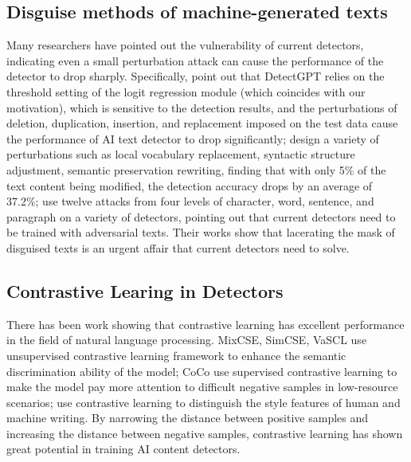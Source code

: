 \documentclass[11pt]{article}
\newcommand{\greenCite}[1]{\textcolor{darkgreen}{\cite{#1}}}
\newcommand{\greenCitep}[1]{\textcolor{darkgreen}{\citep{#1}}}
\begin{document}
	
	\subsection{Disguise methods of machine-generated texts}
	Many researchers have pointed out the vulnerability of current detectors, indicating even a small perturbation attack can cause the performance of the detector to drop sharply\greenCitep{zhou2024navigatingshadows,dugan2024raid,krishna2024paraphrasing,liu2024pecola,huang2024ai,wang2024stumblingblocks}. Specifically, \greenCite{liu2024pecola} point out that DetectGPT relies on the threshold setting of the logit regression module (which coincides with our motivation), which is sensitive to the detection results, and the perturbations of deletion, duplication, insertion, and replacement imposed on the test data cause the performance of AI text detector to drop significantly; \greenCite{dugan2024raid} design a variety of perturbations such as local vocabulary replacement, syntactic structure adjustment, semantic preservation rewriting, finding that with only 5\% of the text content being modified, the detection accuracy drops by an average of 37.2\%; \greenCite{zhou2024navigatingshadows} use twelve attacks from four levels of character, word, sentence, and paragraph on a variety of detectors, pointing out that current detectors need to be trained with adversarial texts. Their works show that lacerating the mask of disguised texts is an urgent affair that current detectors need to solve.

	\subsection{Contrastive Learing in Detectors}
	There has been work showing that contrastive learning has excellent performance in the field of natural language processing\greenCitep{cheng2023ml}. MixCSE\greenCitep{Zhang2022mixcse}, SimCSE\greenCitep{gao2021simcse}, VaSCL\greenCitep{zhang2022vascl} use unsupervised contrastive learning framework to enhance the semantic discrimination ability of the model; CoCo\greenCitep{liu2023coco} use supervised contrastive learning to make the model pay more attention to difficult negative samples in low-resource scenarios; \greenCite{soto2024fewshot,guo2024detective} use contrastive learning to distinguish the style features of human and machine writing. By narrowing the distance between positive samples and increasing the distance between negative samples, contrastive learning has shown great potential in training AI content detectors.
	
\end{document}
